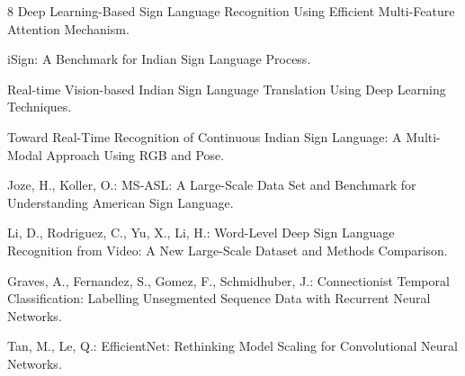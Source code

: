 \documentclass[runningheads]{llncs}
\begin{document}
\begin{thebibliography}{8}
Deep Learning-Based Sign Language Recognition Using Efficient Multi-Feature Attention Mechanism.

iSign: A Benchmark for Indian Sign Language Process.

Real-time Vision-based Indian Sign Language Translation Using Deep Learning Techniques.

Toward Real-Time Recognition of Continuous Indian Sign Language: A Multi-Modal Approach Using RGB and Pose.

Joze, H., Koller, O.: MS-ASL: A Large-Scale Data Set and Benchmark for Understanding American Sign Language.

Li, D., Rodriguez, C., Yu, X., Li, H.: Word-Level Deep Sign Language Recognition from Video: A New Large-Scale Dataset and Methods Comparison.

Graves, A., Fernandez, S., Gomez, F., Schmidhuber, J.: Connectionist Temporal Classification: Labelling Unsegmented Sequence Data with Recurrent Neural Networks.

Tan, M., Le, Q.: EfficientNet: Rethinking Model Scaling for Convolutional Neural Networks.
\end{thebibliography}
\end{document}
